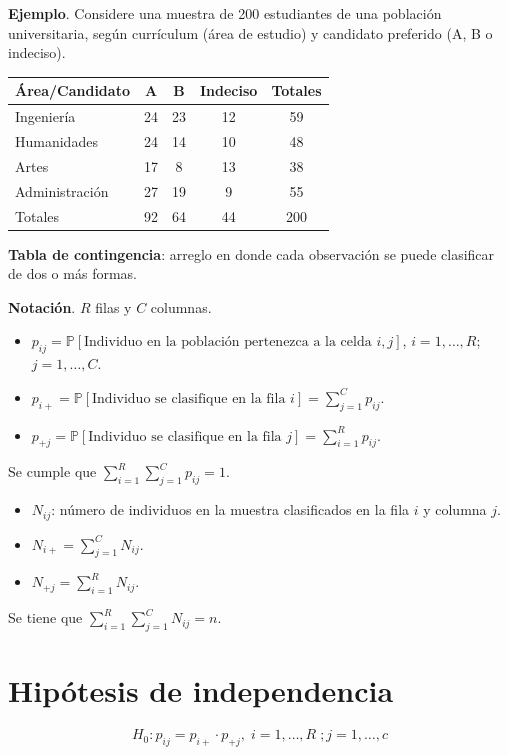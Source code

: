 \documentclass[
  12pt,
]{book}
\begin{document}
\textbf{Ejemplo}. Considere una muestra de 200 estudiantes de una población universitaria, según currículum (área de estudio) y candidato preferido (A, B o indeciso).

\begin{longtable}[]{@{}lcccc@{}}
\toprule
Área/Candidato & A & B & Indeciso & Totales\tabularnewline
\midrule
\endhead
Ingeniería & 24 & 23 & 12 & 59\tabularnewline
Humanidades & 24 & 14 & 10 & 48\tabularnewline
Artes & 17 & 8 & 13 & 38\tabularnewline
Administración & 27 & 19 & 9 & 55\tabularnewline
Totales & 92 & 64 & 44 & 200\tabularnewline
\bottomrule
\end{longtable}

\textbf{Tabla de contingencia}: arreglo en donde cada observación se puede clasificar de dos o más formas.

\textbf{Notación}. \(R\) filas y \(C\) columnas.

\begin{itemize}
\item
  \(p_{ij} = \mathbb P[\text{Individuo en la población pertenezca a la celda }i,j]\), \(i=1,\dots,R\); \(j=1,\dots, C\).
\item
  \(p_{i+} = \mathbb P[\text{Individuo se clasifique en la fila }i] = \sum_{j=1}^C p_{ij}\).
\item
  \(p_{+j} = \mathbb P[\text{Individuo se clasifique en la fila }j] = \sum_{i=1}^R p_{ij}\).
\end{itemize}

Se cumple que \(\sum_{i=1}^R\sum_{j=1}^Cp_{ij} = 1\).

\begin{itemize}
\item
  \(N_{ij}\): número de individuos en la muestra clasificados en la fila \(i\) y columna \(j\).
\item
  \(N_{i+} = \sum_{j=1}^CN_{ij}\).
\item
  \(N_{+j} = \sum_{i=1}^RN_{ij}\).
\end{itemize}

Se tiene que \(\sum_{i=1}^R\sum_{j=1}^C N_{ij} = n\).

\hypertarget{hipuxf3tesis-de-independencia}{%
\section{Hipótesis de independencia}\label{hipuxf3tesis-de-independencia}}

\[H_0: p_{ij} = p_{i+}\cdot p_{+j},\;i=1,\dots,R \; ;j=1,\dots, c\]
\end{document}
